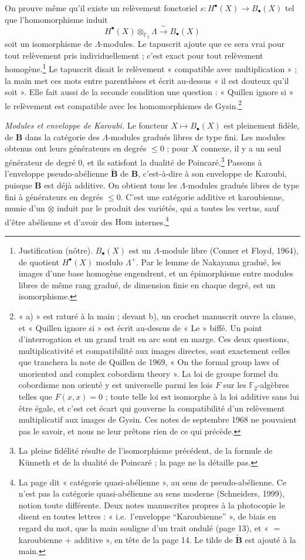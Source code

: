 \documentclass[11pt,a4paper]{article}
\begin{document}
On prouve même qu'il existe un relèvement fonctoriel $s : H^{\bullet}(X) \to
B_\bullet(X)$ tel que l'homomorphisme induit
\[
H^{\bullet}(X) \otimes_{\mathbb{F}_2} \Lambda \xrightarrow{\ \sim\ }
B_\bullet(X)
\]
soit un isomorphisme de $\Lambda$-modules. Le tapuscrit ajoute que ce sera vrai
pour tout relèvement pris individuellement ; c'est exact pour tout relèvement
homogène.\footnote{Justification (nôtre). $B_\bullet(X)$ est un
$\Lambda$-module libre (Conner et Floyd, 1964), de quotient $H^{\bullet}(X)$
modulo $\Lambda^{+}$. Par le lemme de Nakayama gradué, les images d'une base
homogène engendrent, et un épimorphisme entre modules libres de même rang
gradué, de dimension finie en chaque degré, est un isomorphisme.} Le tapuscrit
disait le relèvement « compatible avec multiplication » ; la main met ces mots
entre parenthèses et écrit au-dessus « il est douteux qu'il soit ». Elle fait
aussi de la seconde condition une question : « Quillen ignore si » le
relèvement est compatible avec les homomorphismes de Gysin.\footnote{« a) »
est raturé à la main ; devant b), un crochet manuscrit ouvre la clause, et
« Quillen ignore si » est écrit au-dessus de « Le » biffé. Un point
d'interrogation et un grand trait en arc sont en marge. Ces deux questions,
multiplicativité et compatibilité aux images directes, sont exactement celles
que tranchera la note de Quillen de 1969, « On the formal group laws of
unoriented and complex cobordism theory ». La loi de groupe formel du
cobordisme non orienté y est universelle parmi les lois $F$ sur les
$\mathbb{F}_2$-algèbres telles que $F(x,x) = 0$ ; toute telle loi est
isomorphe à la loi additive sans lui être égale, et c'est cet écart qui
gouverne la compatibilité d'un relèvement multiplicatif aux images de Gysin.
Ces notes de septembre 1968 ne pouvaient pas le savoir, et nous ne leur
prêtons rien de ce qui précède.}

\emph{Modules et enveloppe de Karoubi.} Le foncteur $X \mapsto B_\bullet(X)$
est pleinement fidèle, de $\mathbf{B}$ dans la catégorie des $\Lambda$-modules
gradués libres de type fini. Les modules obtenus ont leurs générateurs en
degrés $\leq 0$ ; pour $X$ connexe, il y a un seul générateur de degré 0, et ils
satisfont la dualité de Poincaré.\footnote{La pleine fidélité résulte de
l'isomorphisme précédent, de la formule de Künneth et de la dualité de
Poincaré ; la page ne la détaille pas.} Passons à l'enveloppe pseudo-abélienne
$\widetilde{\mathbf{B}}$ de $\mathbf{B}$, c'est-à-dire à son enveloppe de
Karoubi, puisque $\mathbf{B}$ est déjà additive. On obtient tous les
$\Lambda$-modules gradués libres de type fini à générateurs en degrés $\leq 0$.
C'est une catégorie additive et karoubienne, munie d'un $\otimes$ induit par le
produit des variétés, qui a toutes les vertus, sauf d'être abélienne et d'avoir
des $\mathrm{Hom}$ internes.\footnote{La page dit « catégorie
quasi-abélienne », au sens de pseudo-abélienne. Ce n'est pas la catégorie
quasi-abélienne au sens moderne (Schneiders, 1999), notion toute différente.
Deux notes manuscrites propres à la photocopie le disent en toutes lettres :
« i.e.\ l'enveloppe “Karoubienne” », de biais en regard du mot, que la main
souligne d'un trait ondulé (page 13), et « $=$ karoubienne $+$ additive »,
en tête de la page 14. Le tilde de $\widetilde{\mathbf{B}}$ est ajouté à la
main.}
\end{document}
